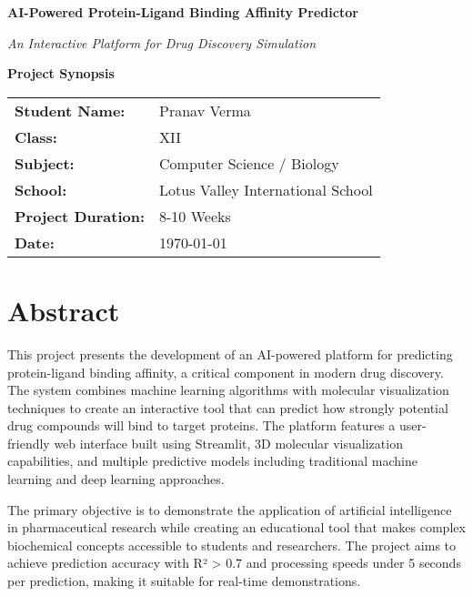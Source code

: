\documentclass[12pt,a4paper]{article}
\begin{document}
\begin{titlepage}
\centering
\vspace*{2cm}

{\Huge\bfseries AI-Powered Protein-Ligand Binding Affinity Predictor}

\vspace{1.5cm}

{\Large\textit{An Interactive Platform for Drug Discovery Simulation}}

\vspace{2cm}


{\large\textbf{Project Synopsis}}

\vspace{2cm}

\begin{tabular}{ll}
\textbf{Student Name:} & Pranav Verma \\
\textbf{Class:} & XII \\
\textbf{Subject:} & Computer Science / Biology \\
\textbf{School:} & Lotus Valley International School \\
\textbf{Project Duration:} & 8-10 Weeks \\
\textbf{Date:} & \today
\end{tabular}

\vfill
\end{titlepage}

\tableofcontents
\newpage

\section{Abstract}

This project presents the development of an AI-powered platform for predicting protein-ligand binding affinity, a critical component in modern drug discovery. The system combines machine learning algorithms with molecular visualization techniques to create an interactive tool that can predict how strongly potential drug compounds will bind to target proteins. The platform features a user-friendly web interface built using Streamlit, 3D molecular visualization capabilities, and multiple predictive models including traditional machine learning and deep learning approaches.

The primary objective is to demonstrate the application of artificial intelligence in pharmaceutical research while creating an educational tool that makes complex biochemical concepts accessible to students and researchers. The project aims to achieve prediction accuracy with R² > 0.7 and processing speeds under 5 seconds per prediction, making it suitable for real-time demonstrations.
\end{document}

